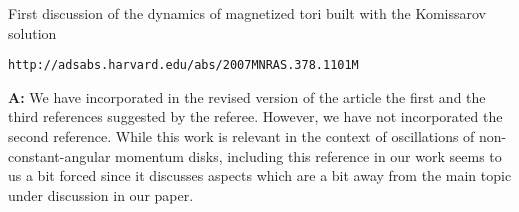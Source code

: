 \documentclass{article}
\begin{document}
\bigskip

First discussion of the dynamics of magnetized tori built with the Komissarov solution

{\tt http://adsabs.harvard.edu/abs/2007MNRAS.378.1101M}

\bigskip

{\bf A:} We have incorporated in the revised version of the article the first and the third references 
suggested by the referee. However, we have not incorporated the second 
reference. While this work is relevant in the context of oscillations 
of non-constant-angular momentum disks, including this reference in our 
work seems to us a bit forced since it discusses aspects which are a bit 
away from the main topic under discussion in our paper.

%


 
\end{document}
